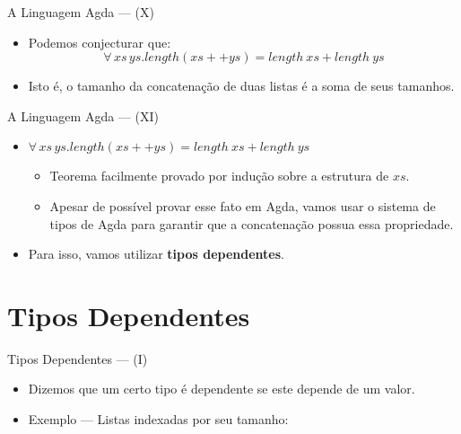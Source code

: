 \documentclass{beamer}
\begin{document}
       \begin{frame}{A Linguagem Agda --- (X)}
         \begin{itemize}
           \item Podemos conjecturar que:
           \[
           \forall\,xs\,ys. length(xs ++ ys) = length\: xs + length\: ys
           \]
           \item Isto \'e, o tamanho da concatena\c{c}\~ao de duas listas \'e a soma de seus tamanhos.
         \end{itemize}
       \end{frame}
       
       \begin{frame}{A Linguagem Agda --- (XI)}
         \begin{itemize}
           \item $\forall\,xs\,ys. length(xs ++ ys) = length\: xs + length\: ys$
           \begin{itemize}
             \item Teorema facilmente provado por indu\c{c}\~ao sobre a estrutura de $xs$.
             \item Apesar de poss\'ivel provar esse fato em Agda, vamos usar o sistema de tipos de Agda
                   para garantir que a concatena\c{c}\~ao possua essa propriedade.
           \end{itemize}
           \item Para isso, vamos utilizar \textbf{tipos dependentes}.
         \end{itemize}
       \end{frame}

       \section{Tipos Dependentes}

       \begin{frame}{Tipos Dependentes --- (I)}
         \begin{itemize}
           \item Dizemos que um certo tipo \'e dependente se este depende de um valor.
           \item Exemplo --- Listas indexadas por seu tamanho:
         \end{itemize}
       \end{frame}
\end{document}
